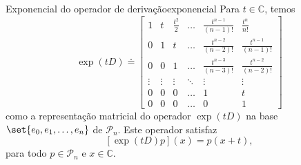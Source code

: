\begin{proposition}{Exponencial do operador de derivação}{exponencial}
    Para \(t \in \mathbb{C}\), temos
    \begin{equation*}
        \exp{(tD)} \doteq \begin{bmatrix}
            1 & t & \frac{t^2}{2} & \dots & \frac{t^{n-1}}{(n-1)!} & \frac{t^n}{n!}\\
            0 & 1 & t & \dots & \frac{t^{n-2}}{(n-2)!} & \frac{t^{n-1}}{(n-1)!}\\
            0 & 0 & 1 & \dots & \frac{t^{n-3}}{(n-3)!} & \frac{t^{n-2}}{(n-2)!}\\
            \vdots & \vdots & \vdots & \ddots& \vdots & \vdots\\
            0 & 0 & 0 & \dots & 1 & t\\
            0 & 0 & 0 & \dots & 0 & 1
        \end{bmatrix}
    \end{equation*}
    como a representação matricial do operador \(\exp(tD)\) na base \(\set{e_0, e_1, \dots, e_n}\) de \(\mathcal{P}_n\). Este operador satisfaz
    \begin{equation*}
        \left[\exp{(tD)}p\right](x) = p(x+t),
    \end{equation*}
    para todo \(p \in \mathcal{P}_n\) e \(x \in \mathbb{C}\).
\end{proposition}
